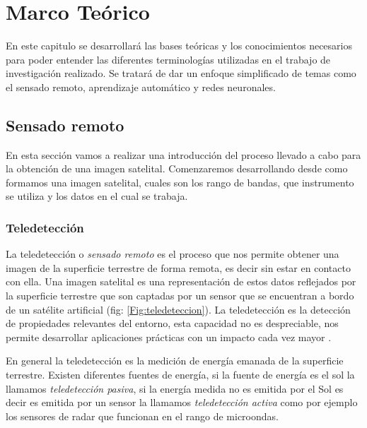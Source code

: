 \chapter{Marco Teórico} \label{chap:marcoteorico}

En este capitulo se desarrollará las bases teóricas y los conocimientos necesarios para poder entender las diferentes terminologías utilizadas en el trabajo de investigación realizado. Se tratará de dar un enfoque simplificado de temas como el sensado remoto,  aprendizaje automático y redes neuronales.

\section{Sensado remoto}\label{sec:sensadoremoto}

En esta sección vamos a realizar una introducción del proceso llevado a cabo para la obtención de una imagen satelital. Comenzaremos desarrollando desde como formamos una imagen satelital, cuales son los rango de bandas, que instrumento se utiliza y los datos en el cual se trabaja.

\subsection{Teledetección}\label{sub:teledeteccion}

La teledetección o \textit{sensado remoto} es el proceso que nos permite obtener una imagen de la superficie terrestre de forma remota, es decir sin estar en contacto con ella. Una imagen satelital es una representación de estos datos reflejados por la superficie terrestre que son captadas por un sensor que se encuentran a bordo de un satélite artificial (fig: \ref{Fig:teledeteccion}). La teledetección es la detección de propiedades relevantes del entorno, esta capacidad no es despreciable, nos permite desarrollar aplicaciones prácticas con un impacto cada vez mayor \citep{percepcion}.

En general la teledetección es la medición de energía emanada de la superficie terrestre. Existen diferentes fuentes de energía, si la fuente de energía es el sol la llamamos \textit{teledetección pasiva}, si la energía medida no es emitida por el Sol es decir es emitida por un sensor la llamamos \textit{teledetección activa} como por ejemplo los sensores de radar que funcionan en el rango de microondas.

